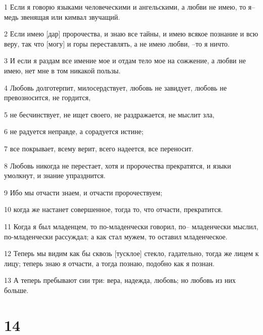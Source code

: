 \par 1 Если я говорю языками человеческими и ангельскими, а любви не имею, то я--медь звенящая или кимвал звучащий.
\par 2 Если имею [дар] пророчества, и знаю все тайны, и имею всякое познание и всю веру, так что [могу] и горы переставлять, а не имею любви, --то я ничто.
\par 3 И если я раздам все имение мое и отдам тело мое на сожжение, а любви не имею, нет мне в том никакой пользы.
\par 4 Любовь долготерпит, милосердствует, любовь не завидует, любовь не превозносится, не гордится,
\par 5 не бесчинствует, не ищет своего, не раздражается, не мыслит зла,
\par 6 не радуется неправде, а сорадуется истине;
\par 7 все покрывает, всему верит, всего надеется, все переносит.
\par 8 Любовь никогда не перестает, хотя и пророчества прекратятся, и языки умолкнут, и знание упразднится.
\par 9 Ибо мы отчасти знаем, и отчасти пророчествуем;
\par 10 когда же настанет совершенное, тогда то, что отчасти, прекратится.
\par 11 Когда я был младенцем, то по-младенчески говорил, по-- младенчески мыслил, по-младенчески рассуждал; а как стал мужем, то оставил младенческое.
\par 12 Теперь мы видим как бы сквозь [тусклое] стекло, гадательно, тогда же лицем к лицу; теперь знаю я отчасти, а тогда познаю, подобно как я познан.
\par 13 А теперь пребывают сии три: вера, надежда, любовь; но любовь из них больше.

\chapter{14}

